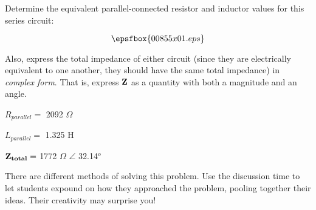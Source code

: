 

Determine the equivalent parallel-connected resistor and inductor values for this series circuit:

$$\epsfbox{00855x01.eps}$$

Also, express the total impedance of either circuit (since they are electrically equivalent to one another, they should have the same total impedance) in {\it complex form}.  That is, express ${\bf Z}$ as a quantity with both a magnitude and an angle.







$R_{parallel} =$ 2092 $\Omega$

\vskip 10pt

$L_{parallel} =$ 1.325 H

\vskip 10pt

${\bf Z_{total}} =$ 1772 $\Omega$ $\angle$ 32.14$^{o}$ 







There are different methods of solving this problem.  Use the discussion time to let students expound on how they approached the problem, pooling together their ideas.  Their creativity may surprise you!




